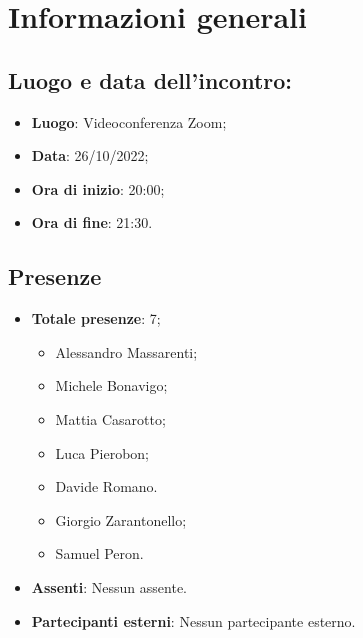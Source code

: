 \section{Informazioni generali}
    \subsection{Luogo e data dell'incontro:}
    \begin{itemize}
        \item \textbf{Luogo}: Videoconferenza Zoom;
        \item \textbf{Data}: 26/10/2022;
        \item \textbf{Ora di inizio}: 20:00;
        \item \textbf{Ora di fine}: 21:30.
    \end{itemize}
    \subsection{Presenze}
    \begin{itemize}
        \item \textbf{Totale presenze}: 7;
        \begin{itemize}
            \item Alessandro Massarenti;
            \item Michele Bonavigo;
            \item Mattia Casarotto;
            \item Luca Pierobon;
            \item Davide Romano.
            \item Giorgio Zarantonello;
            \item Samuel Peron.
        \end{itemize}
        \item \textbf{Assenti}: Nessun assente.
        \item \textbf{Partecipanti esterni}: Nessun partecipante esterno.
    \end{itemize}